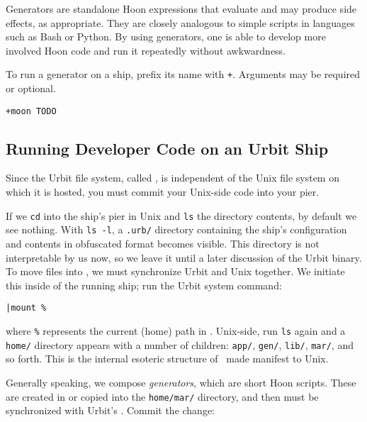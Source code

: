 Generators are standalone Hoon expressions that evaluate and may produce side effects, as appropriate.  They are closely analogous to simple scripts in languages such as Bash or Python.  By using generators, one is able to develop more involved Hoon code and run it repeatedly without awkwardness.


To run a generator on a ship, prefix its name with \texttt{+}.  Arguments may be required or optional.

\begin{lstlisting}[style=nonumbers]
+moon TODO
\end{lstlisting}

\subsection{Running Developer Code on an Urbit Ship}

Since the Urbit file system, called \clay, is independent of the Unix file system on which it is hosted, you must commit your Unix-side code into your pier.

If we \texttt{cd} into the ship's pier in Unix and \texttt{ls} the directory contents, by default we see nothing.  With \texttt{ls -l}, a \texttt{.urb/} directory containing the ship's configuration and contents in obfuscated format becomes visible.  This directory is not interpretable by us now, so we leave it until a later discussion of the Urbit binary.  To move files into \clay, we must synchronize Urbit and Unix together.  We initiate this inside of the running ship; run the Urbit system command:

\begin{lstlisting}[style=nonumbers]
|mount %
\end{lstlisting}

where \texttt{\%} represents the current (home) path in \clay.  Unix-side, run \texttt{ls} again and a \texttt{home/} directory appears with a number of children:  \texttt{app/}, \texttt{gen/}, \texttt{lib/}, \texttt{mar/}, and so forth.  This is the internal esoteric structure of \clay~made manifest to Unix.

Generally speaking, we compose \emph{generators}, which are short Hoon scripts.  These are created in or copied into the \texttt{home/mar/} directory, and then must be synchronized with Urbit's \clay.  Commit the change:

